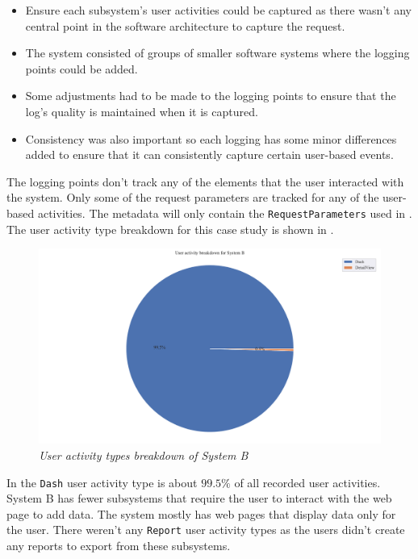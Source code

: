 \begin{itemize}
	\item Ensure each subsystem's user activities could be captured as there wasn't any central point in the software architecture to capture the request. 
	\item The system consisted of groups of smaller software systems where the logging points could be added.
	\item Some adjustments had to be made to the logging points to ensure that the log's quality is maintained when it is captured. 
	\item Consistency was also important so each logging has some minor differences added to ensure that it can consistently capture certain user-based events. \
\end{itemize}

The logging points don't track any of the elements that the user interacted with the system. Only some of the request parameters are tracked for any of the user-based activities. The metadata will only contain the \texttt{RequestParameters} used in . The user activity type breakdown for this case study is shown in .

\begin{figure}[!htb]
	\centering %
	\includegraphics[width=0.95\linewidth]{img/ch3/analysis/case_B_breakdown.pdf}
	\caption[User activity types breakdown of System B]
	{\textit{User activity types breakdown of System B}}\label{fig:ch3_caseBBreakdown}
\end{figure}

In  the \texttt{Dash} user activity type is about $99.5\%$ of all recorded user activities. System B has fewer subsystems that require the user to interact with the web page to add data. The system mostly has web pages that display data only for the user. There weren't any \texttt{Report} user activity types as the users didn't create any reports to export from these subsystems.

